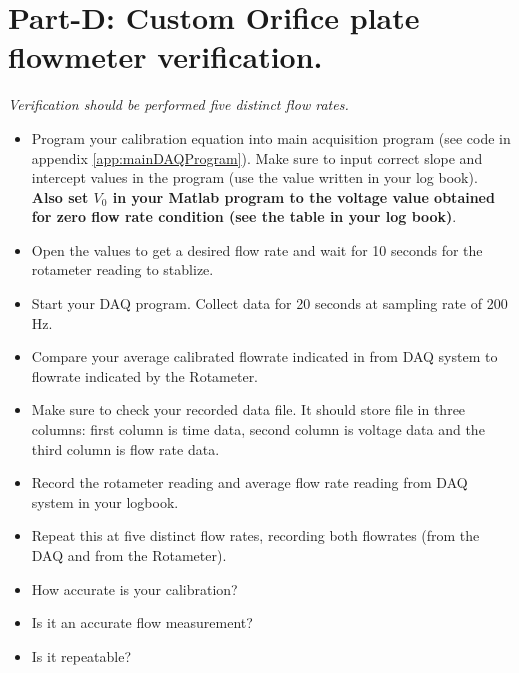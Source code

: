 \documentclass{article} %
\begin{document}
\section{Part-D: Custom Orifice plate flowmeter verification.}
\emph{ Verification should be performed five distinct flow rates.}
\begin{itemize}
\item Program your calibration equation into main acquisition program (see code in appendix \ref{app:mainDAQProgram}). Make sure to input correct slope and intercept values in the program (use the value written in your log book). {\bf Also set $V_0$ in your Matlab program to the voltage value obtained for zero flow rate condition (see the table in your log book)}.
\item Open the values to get a desired flow rate and wait for 10 seconds for the rotameter reading to stablize.
\item Start your DAQ program. Collect data for 20 seconds at sampling rate of 200 Hz.
\item Compare your average calibrated flowrate indicated in from DAQ system to flowrate indicated by the Rotameter.
\item Make sure to check your recorded data file. It should store file in three columns: first column is time data, second column is voltage data and the third column is flow rate data.
\item Record the rotameter reading and average flow rate reading from DAQ system in your logbook.
\item Repeat this at five distinct flow rates, recording both flowrates (from the DAQ and from the Rotameter).
\item How accurate is your calibration?
\item Is it an accurate flow measurement?
\item Is it repeatable?
\end{itemize}
\end{document}
